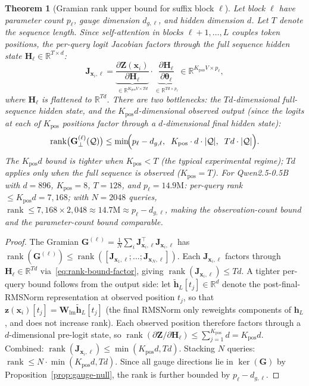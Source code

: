 \documentclass{article}
\newtheorem{theorem}{Theorem}
\newcommand{\R}{\mathbb{R}}
\newcommand{\cQ}{\mathcal{Q}}
\newcommand{\btheta}{\boldsymbol{\theta}}
\newcommand{\bz}{\mathbf{z}}
\newcommand{\bh}{\mathbf{h}}
\newcommand{\bx}{\mathbf{x}}
\newcommand{\bW}{\mathbf{W}}
\newcommand{\bJ}{\mathbf{J}}
\newcommand{\bG}{\mathbf{G}}
\newcommand{\bH}{\mathbf{H}}
\newcommand{\bZ}{\mathbf{Z}}
\DeclareMathOperator{\rank}{rank}
\begin{document}
\begin{theorem}[Gramian rank upper bound for suffix block $\ell$]
\label{thm:rank-bound}
Let block $\ell$ have parameter count $p_\ell$, gauge dimension $d_{g,\ell}$, and hidden dimension $d$. Let $T$ denote the sequence length. Since self-attention in blocks $\ell+1, \ldots, L$ couples token positions, the per-query logit Jacobian factors through the \emph{full sequence} hidden state $\bH_\ell \in \R^{T \times d}$:
\begin{equation}\label{eq:rank-bound-factor}
 \bJ_{\bx_i,\ell} = \underbrace{\frac{\partial \bZ(\bx_i)}{\partial \bH_\ell}}_{\in \R^{K_{\text{pos}} V \times Td}} \cdot \underbrace{\frac{\partial \bH_\ell}{\partial \btheta_\ell}}_{\in \R^{Td \times p_\ell}} \in \R^{K_{\text{pos}} V \times p_\ell},
\end{equation}
where $\bH_\ell$ is flattened to $\R^{Td}$. There are two bottlenecks: the $Td$-dimensional full-sequence hidden state, and the $K_{\text{pos}} d$-dimensional observed output (since the logits at each of $K_{\text{pos}}$ positions factor through a $d$-dimensional final hidden state):
\begin{equation}\label{eq:rank-bound}
 \rank\bigl(\bG_\perp^{(\ell)}(\cQ)\bigr) \leq \min\!\Bigl(p_\ell - d_{g,\ell},\;\; K_{\text{pos}} \cdot d \cdot |\cQ|,\;\; Td \cdot |\cQ|\Bigr).
\end{equation}
The $K_{\text{pos}} d$ bound is tighter when $K_{\text{pos}} < T$ (the typical experimental regime); $Td$ applies only when the full sequence is observed ($K_{\text{pos}} = T$). For Qwen2.5-0.5B with $d=896$, $K_{\text{pos}}=8$, $T=128$, and $p_\ell = 14.9\text{M}$: per-query rank $\leq K_{\text{pos}} d = 7{,}168$; with $N = 2048$ queries, $\rank \leq 7{,}168 \times 2{,}048 \approx 14.7\text{M} \approx p_\ell - d_{g,\ell}$, making the observation-count bound and the parameter-count bound comparable.
\end{theorem}
\begin{proof}
The Gramian $\bG^{(\ell)} = \frac{1}{N}\sum_i \bJ_{\bx_i,\ell}^\top \bJ_{\bx_i,\ell}$ has $\rank(\bG^{(\ell)}) \leq \rank([\bJ_{\bx_1,\ell}; \ldots; \bJ_{\bx_N,\ell}])$. Each $\bJ_{\bx_i,\ell}$ factors through $\bH_\ell \in \R^{Td}$ via~\eqref{eq:rank-bound-factor}, giving $\rank(\bJ_{\bx_i,\ell}) \leq Td$. A tighter per-query bound follows from the output side: let $\tilde{\bh}_L[t_j] \in \R^d$ denote the post-final-RMSNorm representation at observed position $t_j$, so that $\bz(\bx_i)[t_j] = \bW_\text{lm}\tilde{\bh}_L[t_j]$ (the final RMSNorm only reweights components of $\bh_L$, and does not increase rank). Each observed position therefore factors through a $d$-dimensional pre-logit state, so $\rank(\partial \bZ / \partial \bH_\ell) \leq \sum_{j=1}^{K_{\text{pos}}} d = K_{\text{pos}} d$. Combined: $\rank(\bJ_{\bx_i,\ell}) \leq \min(K_{\text{pos}} d, Td)$. Stacking $N$ queries: $\rank \leq N \cdot \min(K_{\text{pos}} d, Td)$. Since all gauge directions lie in $\ker(\bG)$ by Proposition~\ref{prop:gauge-null}, the rank is further bounded by $p_\ell - d_{g,\ell}$.
\end{proof}
\end{document}
